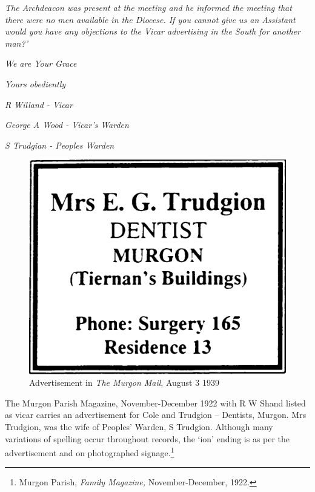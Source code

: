 \emph{The Archdeacon was present at the meeting and he informed the meeting that there were no men available in the Diocese. If you cannot give us an Assistant would you have any objections to the Vicar advertising in the South for another man?'}



\emph{We are Your Grace}



\emph{Yours obediently}



\emph{R Willand - Vicar}



\emph{George A Wood - Vicar's Warden}



\emph{S Trudgian - Peoples Warden}



\medskip








\begin{figure}
\begin{center}
\includegraphics[width=.6\linewidth,center]{../images/trudgionAd.jpg}
\caption{Advertisement in \emph{The Murgon Mail}, August 3 1939}
\end{center}
\end{figure}




The Murgon Parish Magazine, November-December 1922 with R W Shand listed as vicar carries an advertisement for Cole and Trudgion -- Dentists, Murgon. Mrs Trudgion, was the wife of Peoples' Warden, S Trudgion. Although many variations of spelling occur throughout records, the `ion' ending is as per the advertisement and on photographed signage.\footnote{Murgon Parish, \emph{Family Magazine,} November-December, 1922.}


